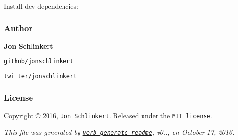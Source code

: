 Install dev dependencies\+:




\subsubsection*{Author}

{\bfseries Jon Schlinkert}


\begin{DoxyItemize}
\item \href{https://github.com/jonschlinkert}{\tt github/jonschlinkert}
\item \href{http://twitter.com/jonschlinkert}{\tt twitter/jonschlinkert}
\end{DoxyItemize}

\subsubsection*{License}

Copyright © 2016, \href{https://github.com/jonschlinkert}{\tt Jon Schlinkert}. Released under the \href{https://github.com/jonschlinkert/fragment-cache/blob/master/LICENSE}{\tt M\+IT license}.





{\itshape This file was generated by \href{https://github.com/verbose/verb-generate-readme}{\tt verb-\/generate-\/readme}, v0.., on October 17, 2016.} 